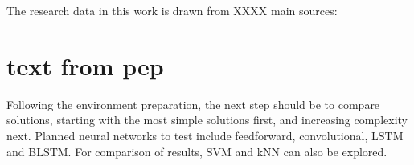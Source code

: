 The research data in this work is drawn from XXXX main sources:


\section{text from pep}









Following the environment preparation, the next step should be to compare solutions, starting with the most simple solutions first, and increasing complexity next. Planned neural networks to test include feedforward, convolutional, LSTM and BLSTM. For comparison of results, SVM and kNN can also be explored.

